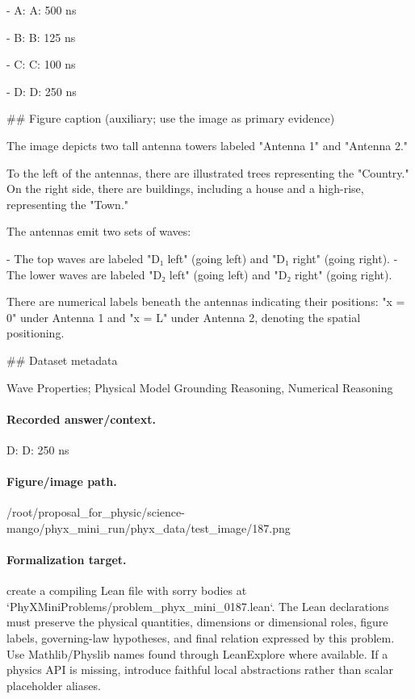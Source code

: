- A: A: 500 ns

- B: B: 125 ns

- C: C: 100 ns

- D: D: 250 ns

\#\# Figure caption (auxiliary; use the image as primary evidence)

The image depicts two tall antenna towers labeled "Antenna 1" and "Antenna 2." 

To the left of the antennas, there are illustrated trees representing the "Country." On the right side, there are buildings, including a house and a high-rise, representing the "Town." 

The antennas emit two sets of waves: 

- The top waves are labeled "D₁ left" (going left) and "D₁ right" (going right).
- The lower waves are labeled "D₂ left" (going left) and "D₂ right" (going right).

There are numerical labels beneath the antennas indicating their positions: "x = 0" under Antenna 1 and "x = L" under Antenna 2, denoting the spatial positioning.

\#\# Dataset metadata

Wave Properties; Physical Model Grounding Reasoning, Numerical Reasoning

\paragraph{Recorded answer/context.}
D: D: 250 ns

\paragraph{Figure/image path.}
/root/proposal\_for\_physic/science-mango/phyx\_mini\_run/phyx\_data/test\_image/187.png

\paragraph{Formalization target.}
create a compiling Lean file with sorry bodies at `PhyXMiniProblems/problem\_phyx\_mini\_0187.lean`. The Lean declarations must preserve the physical quantities, dimensions or dimensional roles, figure labels, governing-law hypotheses, and final relation expressed by this problem.
Use Mathlib/Physlib names found through LeanExplore where available. If a physics API is missing, introduce faithful local abstractions rather than scalar placeholder aliases.

